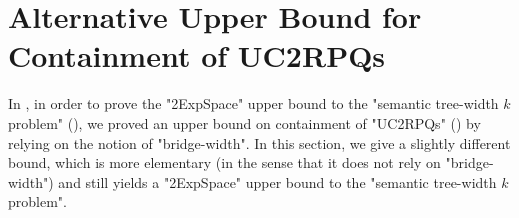 

\section{Alternative Upper Bound for Containment of UC2RPQs}
\label{apdx-sec:alternative-upper-bound-containment}

In , in order to prove the "2ExpSpace" upper bound to the 
"semantic tree-width $k$ problem" (), we proved an upper bound on containment
of "UC2RPQs" () by relying on the notion of "bridge-width".
In this section, we give a slightly different bound, which is more elementary (in the sense that it 
does not rely on "bridge-width") and still yields a "2ExpSpace" upper bound to the "semantic 
tree-width $k$ problem".

